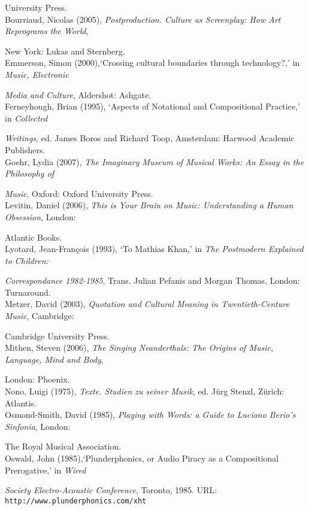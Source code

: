 University Press.\\
Bourriaud, Nicolas (2005), \emph{Postproduction. Culture as Screenplay: How Art Reprograms the World}, 

New York: Lukas and Sternberg.\\
Emmerson, Simon (2000),`Crossing cultural boundaries through technology?,'  in \emph{Music, Electronic}

\emph{Media and Culture}, Aldershot: Ashgate.\\
Ferneyhough, Brian (1995), `Aspects of Notational and Compositional Practice,' in \emph{Collected}

\emph{Writings}, ed. James Boros and Richard Toop, Amsterdam: Harwood Academic Publishers.\\
Goehr, Lydia (2007), \emph{The Imaginary Museum of Musical Works: An Essay in the Philosophy of}

\emph{Music}, Oxford: Oxford University Press.\\
Levitin, Daniel (2006), \emph{This is Your Brain on Music: Understanding a Human Obsession}, London: 

Atlantic Books.\\
Lyotard, Jean-Fran\c{c}ois (1993), `To Mathias Khan,' in \emph{The Postmodern Explained to Children:} 

\emph{Correspondance 1982-1985}, Trans. Julian Pefanis and Morgan Thomas, London: Turnaround.\\
Metzer, David (2003), \emph{Quotation and Cultural Meaning in Twentieth-Centure Music}, Cambridge: 

Cambridge University Press.\\
Mithen, Steven (2006), \emph{The Singing Neanderthals: The Origins of Music, Language, Mind and Body}, 

London: Phoenix.\\
Nono, Luigi (1975), \emph{Texte. Studien zu seiner Musik}, ed. J\"{u}rg Stenzl, Z\"{u}rich: Atlantis.\\
Osmond-Smith, David (1985), \emph{Playing with Words: a Guide to Luciano Berio's Sinfonia},  London: 

The Royal Musical Association.\\
Oswald, John (1985),`Plunderphonics, or Audio Piracy as a Compositional Prerogative,' in \emph{Wired}

\emph{Society Electro-Acoustic Conference}, Toronto, 1985. URL: \texttt{http://www.plunderphonics.com/xht}

